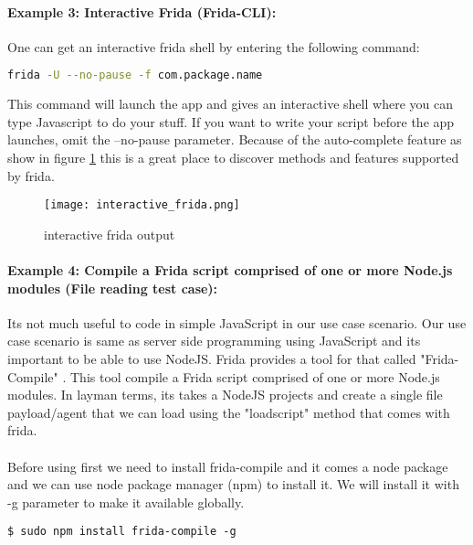 \documentclass[../main.tex]{subfile}
\begin{document}
	
	\paragraph{Example 3: Interactive Frida (Frida-CLI):}
	One can get an interactive frida shell by entering the following command:
	\begin{lstlisting}[language=bash, numbers=none]
		frida -U --no-pause -f com.package.name
	\end{lstlisting}
	This command will launch the app and gives an interactive shell where you can type Javascript to do your stuff. If you want to write your
	script before the app launches, omit the --no-pause parameter. Because of the auto-complete feature as show in figure \ref{fig:interactive_frida} this is a great place to discover methods and features supported by frida.
	\begin{figure}[H]
		\texttt{[image: interactive\_frida.png]}
		\caption{interactive frida output }
		\label{fig:interactive_frida}
	\end{figure}

	\paragraph{Example 4: Compile a Frida script comprised of one or more Node.js modules (File reading test case):} Its not much useful to code in simple JavaScript in our use case scenario. Our use case scenario is same as server side programming using JavaScript and its important to be able to use NodeJS. Frida provides a tool for that called "Frida-Compile" \cite{frida_compile}. This tool compile a Frida script comprised of one or more Node.js modules. In layman terms, its takes a NodeJS projects and create a single file payload/agent that we can load using the "load\textunderscore script" method that comes with frida.
	\paragraph{} Before using first we need to install frida-compile and it comes a node package and we can use node package manager (npm) to install it. We will install it with -g parameter to make it available globally.
	\begin{lstlisting}[numbers=none]
	$ sudo npm install frida-compile -g
	\end{lstlisting}
	
	
\end{document}
